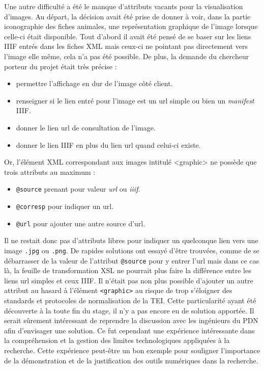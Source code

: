 \documentclass[a4paper,12pt,twoside]{book}
\begin{document}
Une autre difficulté a été le manque d'attributs vacants pour la visualisation d'images. Au départ, la décision avait été prise de donner à voir, dans la partie iconographie des fiches animales, une représentation graphique de l'image lorsque celle-ci était disponible. Tout d'abord il avait été pensé de se baser sur les liens IIIF entrés dans les fiches XML mais ceux-ci ne pointant pas directement vers l'image elle même, cela n'a pas été possible. De plus, la demande du chercheur porteur du projet était très précise :
\begin{itemize}
    \item permettre l'affichage en dur de l'image côté client.
    \item renseigner si le lien entré pour l'image est un url simple ou bien un \textit{manifest} \acrshort{IIIF}.
    \item donner le lien url de consultation de l'image.
    \item donner le lien \acrshort{IIIF} en plus du lien url quand celui-ci existe.
\end{itemize}
Or, l'élément XML correspondant aux images intitulé <graphic> ne possède que trois attributs au maximum :
\begin{itemize}
    \item \texttt{@source} prenant pour valeur \textit{url} ou \textit{iiif}.
    \item \texttt{@corresp} pour indiquer un url.
    \item \texttt{@url} pour ajouter une autre source d'url.
\end{itemize}
Il ne restait donc pas d'attributs libres pour indiquer un quelconque lien vers une image \texttt{.jpg} ou \texttt{.png}. De rapides solutions ont essayé d'être trouvées, comme de se débarrasser de la valeur de l'attribut \texttt{@source} pour y entrer l'url mais dans ce cas là, la feuille de transformation \acrshort{XSL} ne pourrait plus faire la différence entre les liens url simples et ceux \acrshort{IIIF}. Il n'était pas non plus possible d'ajouter un autre attribut au hasard à l'élément \texttt{<graphic>} au risque de trop s'éloigner des standards et protocoles de normalisation de la TEI. Cette particularité ayant été découverte à la toute fin du stage, il n'y a pas encore eu de solution apportée. Il serait sûrement intéressant de reprendre la discussion avec les ingénieurs du \acrshort{PDN} afin d'envisager une solution. Ce fut cependant une expérience intéressante dans la compréhension et la gestion des limites technologiques appliquées à la recherche. Cette expérience peut-être un bon exemple pour souligner l'importance de la démonstration et de la justification des outils numériques dans la recherche.
\end{document}
